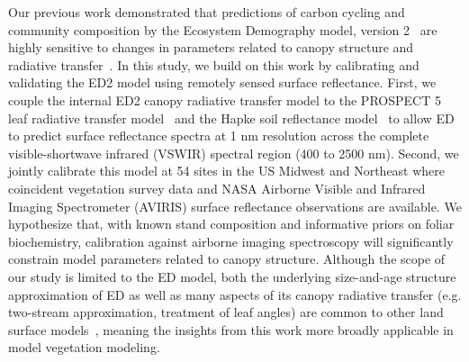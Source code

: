 Our previous work demonstrated that predictions of carbon cycling and community composition by the Ecosystem Demography model, version 2~\citep[ED2;][]{medvigy2009mechanistic} are highly sensitive to changes in parameters related to canopy structure and radiative transfer~\citep{viskari_2019_influence}.
In this study, we build on this work by calibrating and validating the ED2 model using remotely sensed surface reflectance.
First, we couple the internal ED2 canopy radiative transfer model to the PROSPECT 5 leaf radiative transfer model~\citep{feret2008prospect4} and the Hapke soil reflectance model~\citep{verhoef2007coupled} to allow ED to predict surface reflectance spectra at 1 \unit{nm} resolution across the complete visible-shortwave infrared (VSWIR) spectral region (400 to 2500 nm).
Second, we jointly calibrate this model at 54 sites in the US Midwest and Northeast where coincident vegetation survey data and NASA Airborne Visible and Infrared Imaging Spectrometer (AVIRIS) surface reflectance observations are available.
We hypothesize that, with known stand composition and informative priors on foliar biochemistry, calibration against airborne imaging spectroscopy will significantly constrain model parameters related to canopy structure.
Although the scope of our study is limited to the ED model, both the underlying size-and-age structure approximation of ED as well as many aspects of its canopy radiative transfer (e.g. two-stream approximation, treatment of leaf angles) are common to other land surface models~\citep[e.g., FATES]{koven2020benchmarking}, meaning the insights from this work more broadly applicable in model vegetation modeling.
